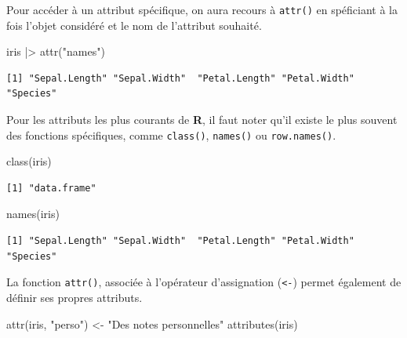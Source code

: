\documentclass[
  letterpaper,
  DIV=11,
  numbers=noendperiod,
  oneside]{scrreprt}
\newenvironment{Shaded}{\begin{snugshade}}{\end{snugshade}}
\newcommand{\FunctionTok}[1]{\textcolor[rgb]{0.28,0.35,0.67}{#1}}
\newcommand{\NormalTok}[1]{\textcolor[rgb]{0.00,0.23,0.31}{#1}}
\newcommand{\OtherTok}[1]{\textcolor[rgb]{0.00,0.23,0.31}{#1}}
\newcommand{\SpecialCharTok}[1]{\textcolor[rgb]{0.37,0.37,0.37}{#1}}
\newcommand{\StringTok}[1]{\textcolor[rgb]{0.13,0.47,0.30}{#1}}
\begin{document}
Pour accéder à un attribut spécifique, on aura recours à \texttt{attr()}
en spéficiant à la fois l'objet considéré et le nom de l'attribut
souhaité.

\begin{Shaded}
\begin{Highlighting}[]
\NormalTok{iris }\SpecialCharTok{|\textgreater{}} \FunctionTok{attr}\NormalTok{(}\StringTok{"names"}\NormalTok{)}
\end{Highlighting}
\end{Shaded}

\begin{verbatim}
[1] "Sepal.Length" "Sepal.Width"  "Petal.Length" "Petal.Width"  "Species"     
\end{verbatim}

Pour les attributs les plus courants de \textbf{R}, il faut noter qu'il
existe le plus souvent des fonctions spécifiques, comme
\texttt{class()}, \texttt{names()} ou \texttt{row.names()}.

\begin{Shaded}
\begin{Highlighting}[]
\FunctionTok{class}\NormalTok{(iris)}
\end{Highlighting}
\end{Shaded}

\begin{verbatim}
[1] "data.frame"
\end{verbatim}

\begin{Shaded}
\begin{Highlighting}[]
\FunctionTok{names}\NormalTok{(iris)}
\end{Highlighting}
\end{Shaded}

\begin{verbatim}
[1] "Sepal.Length" "Sepal.Width"  "Petal.Length" "Petal.Width"  "Species"     
\end{verbatim}

La fonction \texttt{attr()}, associée à l'opérateur d'assignation
(\texttt{\textless{}-}) permet également de définir ses propres
attributs.

\begin{Shaded}
\begin{Highlighting}[]
\FunctionTok{attr}\NormalTok{(iris, }\StringTok{"perso"}\NormalTok{) }\OtherTok{\textless{}{-}} \StringTok{"Des notes personnelles"}
\FunctionTok{attributes}\NormalTok{(iris)}
\end{Highlighting}
\end{Shaded}
\end{document}
